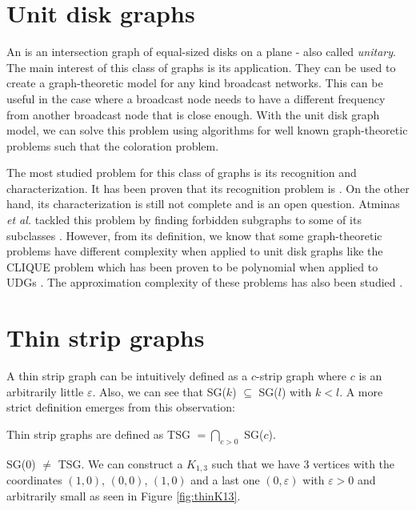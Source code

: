 \section{Unit disk graphs}

An \emph{} is an intersection graph of equal-sized disks on a plane - also called \emph{unitary}. The main interest of this class of graphs is its application. They can be used to create a graph-theoretic model for any kind broadcast networks. This can be useful in the case where a broadcast node needs to have a different frequency from another broadcast node that is close enough. With the unit disk graph model, we can solve this problem using algorithms for well known graph-theoretic problems such that the coloration problem.

The most studied problem for this class of graphs is its recognition and characterization. It has been proven that its recognition problem is  \cite{Schaefer2013}. On the other hand, its characterization is still not complete and is an open question. Atminas \textit{et al.} tackled this problem by finding forbidden subgraphs to some of its subclasses \cite{atminasForbiddenInducedSubgraphs2016}. However, from its definition, we know that some graph-theoretic problems have different complexity when applied to unit disk graphs like the CLIQUE problem which has been proven to be polynomial when applied to UDGs \cite{CLARK1990165}. The approximation complexity of these problems has also been studied \cite{DBLP:journals/corr/abs-1712-05010}.


\section{Thin strip graphs}

A thin strip graph can be intuitively defined as a $c$-strip graph where $c$ is an arbitrarily little $\varepsilon$. Also, we can see that SG($k$) $\subseteq$ SG($l$) with $k<l$. A more strict definition emerges from this observation:

\begin{defn}
  Thin strip graphs are defined as TSG $= \bigcap_{c > 0}$ SG($c$).
\end{defn}

\begin{remark}
  SG($0$) $\neq$ TSG. We can construct a $K_{1,3}$ such that we have 3 vertices with the coordinates
  $(1,0)$, $(0,0)$, $(1,0)$ and a last one $(0,\varepsilon)$ with $\varepsilon > 0$ and arbitrarily small
  as seen in Figure \ref{fig:thinK13}.
\end{remark}

